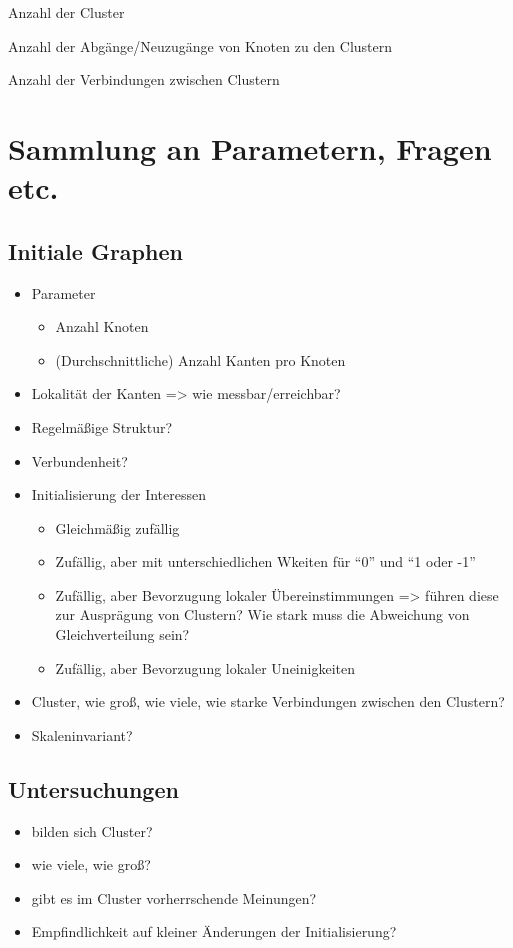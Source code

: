 \documentclass[11pt, a4paper]{scrartcl}
\begin{document}
Anzahl der Cluster

Anzahl der Abgänge/Neuzugänge von Knoten zu den Clustern

Anzahl der Verbindungen zwischen Clustern

\printbibliography

\appendix
\section{Sammlung an Parametern, Fragen etc.}
\subsection{Initiale Graphen}
\begin{itemize}
\item Parameter\begin{itemize}
	\item Anzahl Knoten
	\item (Durchschnittliche) Anzahl Kanten pro Knoten
\end{itemize}
\item Lokalität der Kanten => wie messbar/erreichbar?
\item Regelmäßige Struktur?
\item Verbundenheit?
\item Initialisierung der Interessen\begin{itemize}
	\item Gleichmäßig zufällig
	\item Zufällig, aber mit unterschiedlichen Wkeiten für "`0"' und "`1 oder -1"'
	\item Zufällig, aber Bevorzugung lokaler Übereinstimmungen => führen diese zur Ausprägung von Clustern? Wie stark muss die Abweichung von Gleichverteilung sein?
	\item Zufällig, aber Bevorzugung lokaler Uneinigkeiten
\end{itemize}
\item Cluster, wie groß, wie viele, wie starke Verbindungen zwischen den Clustern?
\item Skaleninvariant?
\end{itemize}

\subsection{Untersuchungen}
\begin{itemize}
\item bilden sich Cluster?
\item wie viele, wie groß?
\item gibt es im Cluster vorherrschende Meinungen?
\item Empfindlichkeit auf kleiner Änderungen der Initialisierung?
\end{itemize}
\end{document}
